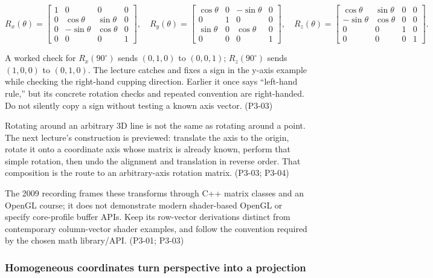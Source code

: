 \[
R_x(\theta)=\begin{bmatrix}1&0&0&0\\0&\cos\theta&\sin\theta&0\\0&-\sin\theta&\cos\theta&0\\0&0&0&1\end{bmatrix},\quad
R_y(\theta)=\begin{bmatrix}\cos\theta&0&-\sin\theta&0\\0&1&0&0\\\sin\theta&0&\cos\theta&0\\0&0&0&1\end{bmatrix},\quad
R_z(\theta)=\begin{bmatrix}\cos\theta&\sin\theta&0&0\\-\sin\theta&\cos\theta&0&0\\0&0&1&0\\0&0&0&1\end{bmatrix}.
\]

A worked check for \(R_x(90^\circ)\) sends \((0,1,0)\) to \((0,0,1)\); \(R_z(90^\circ)\) sends \((1,0,0)\) to \((0,1,0)\). The lecture catches and fixes a sign in the y-axis example while checking the right-hand cupping direction. Earlier it once says ``left-hand rule,'' but its concrete rotation checks and repeated convention are right-handed. Do not silently copy a sign without testing a known axis vector. (P3-03)

Rotating around an arbitrary 3D line is not the same as rotating around a point. The next lecture's construction is previewed: translate the axis to the origin, rotate it onto a coordinate axis whose matrix is already known, perform that simple rotation, then undo the alignment and translation in reverse order. That composition is the route to an arbitrary-axis rotation matrix. (P3-03; P3-04)

The 2009 recording frames these transforms through C++ matrix classes and an OpenGL course; it does not demonstrate modern shader-based OpenGL or specify core-profile buffer APIs. Keep its row-vector derivations distinct from contemporary column-vector shader examples, and follow the convention required by the chosen math library/API. (P3-01; P3-03)

\subsubsection{Homogeneous coordinates turn perspective into a projection}\label{03-visual-computing-i-ch001-homogeneous-coordinates-turn-perspective-into-a-projection}

